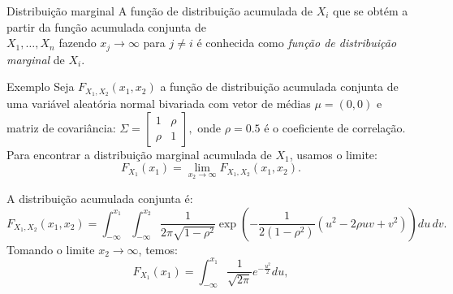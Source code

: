 %
%
%
%
%
%
%


\begin{frame}
\begin{block}{Distribuição marginal}
	A função de distribuição acumulada de $X_i$ que se obtém a partir da função acumulada conjunta de\\ $X_1,\ldots,X_n$ fazendo
	$x_j\rightarrow\infty$ para $j\ne i$ é conhecida como {\em função de distribuição marginal} de $X_i$.
\end{block}

\begin{block}{Exemplo}
	Seja \( F_{X_1, X_2}(x_1, x_2) \) a função de distribuição acumulada conjunta de uma variável aleatória normal bivariada com vetor de médias \( \mu = (0, 0) \) e matriz de covariância:
$
	\Sigma = \begin{bmatrix}
		1 & \rho \\
		\rho & 1
	\end{bmatrix},
	$
	onde \( \rho = 0.5 \) é o coeficiente de correlação. Para encontrar a distribuição marginal acumulada de \( X_1 \), usamos o limite:
	\[
	F_{X_1}(x_1) = \lim_{x_2 \to \infty} F_{X_1, X_2}(x_1, x_2).
	\]
	
	A distribuição acumulada conjunta é:
	\[
	F_{X_1, X_2}(x_1, x_2) = \int_{-\infty}^{x_1} \int_{-\infty}^{x_2} \frac{1}{2\pi\sqrt{1 - \rho^2}}
	\exp\left( -\frac{1}{2(1 - \rho^2)} \left(u^2 - 2\rho uv + v^2 \right) \right) du \, dv.
	\]
		Tomando o limite \( x_2 \to \infty \), temos:
	\[
	F_{X_1}(x_1) = \int_{-\infty}^{x_1} \frac{1}{\sqrt{2\pi}} e^{-\frac{u^2}{2}} du,
	\]
\end{block}	

\end{frame}

